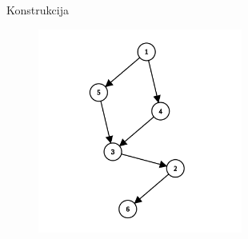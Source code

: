 \begin{statement}[
  problempoints=110,
  timelimit=1 sekunda,
  memorylimit=512 MiB,
]{Konstrukcija}
\setlength\intextsep{-0.5cm}
\begin{figure}
\centering
\includegraphics[width=0.6\textwidth]{graph.png}
\end{figure}

\end{statement}


